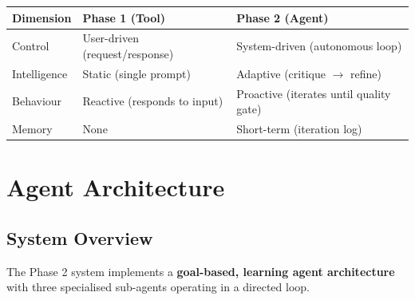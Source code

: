 \documentclass[12pt,a4paper]{article}
\begin{document}
\begin{center}
\begin{tabular}{lll}
  \toprule
  \textbf{Dimension} & \textbf{Phase 1 (Tool)} & \textbf{Phase 2 (Agent)} \\
  \midrule
  Control      & User-driven (request/response) & System-driven (autonomous loop) \\
  Intelligence & Static (single prompt)         & Adaptive (critique $\rightarrow$ refine) \\
  Behaviour    & Reactive (responds to input)   & Proactive (iterates until quality gate) \\
  Memory       & None                           & Short-term (iteration log) \\
  \bottomrule
\end{tabular}
\end{center}


\section{Agent Architecture}
\label{sec:architecture}

\subsection{System Overview}

The Phase 2 system implements a \textbf{goal-based, learning agent architecture} with three
specialised sub-agents operating in a directed loop.
\end{document}
